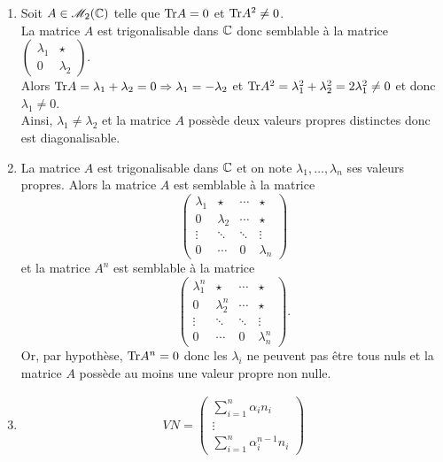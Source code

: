 \begin{solution}
    \begin{enumerate}
        \item Soit $A \in \mathscr{M}_2(\mathbb{C})$ telle que $\mathrm{Tr}{A} = 0$ et $\mathrm{Tr}{A^2} \not=0$. \\
        La matrice $A$ est trigonalisable dans $\mathbb{C}$ donc semblable à la matrice $\begin{pmatrix} \lambda_1 & \star \\ 0 & \lambda_2 \end{pmatrix}$. \\
        Alors $\mathrm{Tr}{A} = \lambda_1 + \lambda_2 = 0 \Rightarrow \lambda_1 = - \lambda_2$ et $\mathrm{Tr}{A^2} = \lambda_1^2 + \lambda_2^2 = 2 \lambda_1^2 \not=0$ et donc $\lambda_1 \not=0$. \\
        Ainsi, $\lambda_1 \not= \lambda_2$ et la matrice $A$ possède deux valeurs propres distinctes donc est diagonalisable. 
        \item La matrice $A$ est trigonalisable dans $\mathbb{C}$ et on note $\lambda_1, \dots, \lambda_n$ ses valeurs propres. Alors la matrice $A$ est semblable à la matrice 
        $$
        \begin{pmatrix}
            \lambda_1 & \star & \cdots & \star \\
            0 & \lambda_2 & \cdots & \star \\
            \vdots & \ddots &\ddots & \vdots \\
            0 & \cdots & 0 & \lambda_n
        \end{pmatrix}
        $$
        et la matrice $A^n$ est semblable à la matrice
        $$
        \begin{pmatrix}
            \lambda_1^n & \star & \cdots & \star \\
            0 & \lambda_2^n & \cdots & \star \\
            \vdots & \ddots &\ddots & \vdots \\
            0 & \cdots & 0 & \lambda_n^n
        \end{pmatrix}.
        $$
        Or, par hypothèse, $\mathrm{Tr}{A^n} = 0$ donc les $\lambda_i$ ne peuvent pas être tous nuls et la matrice $A$ possède au moins une valeur propre non nulle.
        \item
        \begin{align*}
            V N = 
            \begin{pmatrix}
                \sum\limits_{i=1}^n \alpha_i n_i \\ \vdots \\ \sum\limits_{i=1}^n \alpha_i^{n-1} n_i

\end{pmatrix}
\end{align*}
\end{enumerate}
\end{solution}

